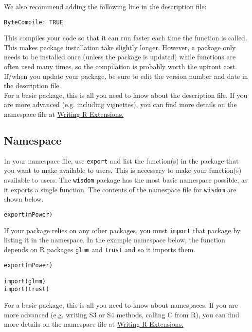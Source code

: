 \documentclass{article}
\begin{document}
We also recommend adding the following line in the description file:
\begin{verbatim}
ByteCompile: TRUE
\end{verbatim}
This compiles your code so that it can run faster each time the function is called. This makes package installation take slightly longer. However, a package only needs to be installed once (unless the package is updated) while functions are often used many times, so the compilation is probably worth the upfront cost.\\

If/when you update your package, be sure to edit the version number and date in the description file. \\ 

For a basic package, this is all you need to know about the description file. If you are more advanced (e.g. including vignettes), you can find more details on the namespace file at  \href{https://cran.r-project.org/doc/manuals/R-exts.html#The-DESCRIPTION-file}{Writing R Extensions.}


\subsection{Namespace} In your namespace file, use  \texttt{export} and list the function(s) in the package that you want to make available to users. This is necessary to make your function(s) available to users. The  \texttt{wisdom} package has the most basic namespace possible, as it exports a single function. The contents of the namespace file for \texttt{wisdom} are shown below.

\begin{verbatim}
export(mPower)
\end{verbatim}

If your package relies on any other packages, you must \texttt{import} that package by listing it in the namespace. In the example namespace below, the function depends on R packages \texttt{glmm} and \texttt{trust} and so it imports them.

\begin{verbatim}
export(mPower)

import(glmm)
import(trust)
\end{verbatim}

For a basic package, this is all you need to know about namespaces. If you are more advanced (e.g. writing S3 or S4 methods, calling C from R), you can find more details on the namespace file at  \href{https://cran.r-project.org/doc/manuals/R-exts.html#Package-namespaces}{Writing R Extensions.}
\end{document}

